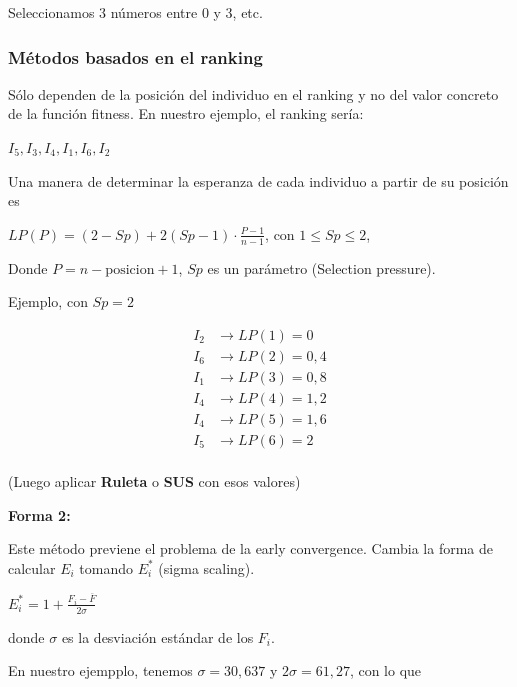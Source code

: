 \documentclass[10pt,a4paper]{article}
\begin{document}
Seleccionamos $3$ números entre $0$ y $3 $, etc.

\subsubsection*{Métodos basados en el ranking}

Sólo dependen de la posición del individuo en el ranking y no del valor concreto de la función fitness. En nuestro ejemplo, el ranking sería:

\begin{center}
$I_5, I_3, I_4, I_1, I_6, I_2$
\end{center}

Una manera de determinar la esperanza de cada individuo a partir de su posición es

\begin{center}
$LP(P) = (2-Sp) + 2(Sp-1) \cdot \frac{P-1}{n-1}$, con $1 \leq Sp \leq 2$,
\end{center}

Donde $P=n- \text{posicion} + 1$, $Sp$ es un parámetro (Selection pressure).

Ejemplo, con $Sp = 2$

\begin{center}
\begin{align*} I_2&\rightarrow LP(1) = 0\\ I_6&\rightarrow LP(2) = 0,4\\ I_1&\rightarrow LP(3) = 0,8\\ I_4&\rightarrow LP(4) = 1,2\\ I_4&\rightarrow LP(5) = 1,6\\ I_5&\rightarrow LP(6) = 2\\ \end{align*}
\end{center}

(Luego aplicar \textbf{Ruleta} o \textbf{SUS} con esos valores)

\textbf{Forma 2:}

Este método previene el problema de la early convergence. Cambia la forma de calcular $E_i$ tomando $E_i^*$ (sigma scaling).

\begin{center}
$E_i^* = 1 + \frac{F_i - \overline{F}}{2\sigma} $
\end{center}

donde $\sigma$ es la desviación estándar de los $F_i$.

En nuestro ejempplo, tenemos $\sigma = 30,637$ y $2\sigma = 61,27$, con lo que
\end{document}
